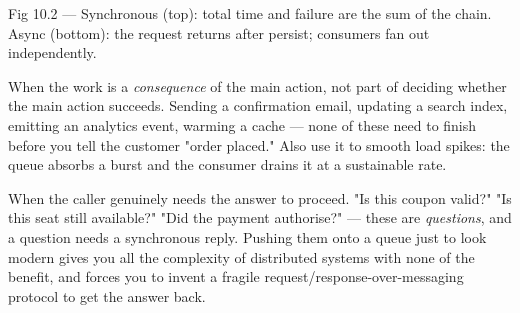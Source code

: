 \begin{wbfigure}{Fig 10.2 --- Synchronous (top): total time and failure are the sum of the chain. Async (bottom): the request returns after persist; consumers fan out independently.}
\end{wbfigure}

 When the work is a \emph{consequence} of the main action, not part of deciding whether the main action succeeds. Sending a confirmation email, updating a search index, emitting an analytics event, warming a cache --- none of these need to finish before you tell the customer "order placed." Also use it to smooth load spikes: the queue absorbs a burst and the consumer drains it at a sustainable rate.

 When the caller genuinely needs the answer to proceed. "Is this coupon valid?" "Is this seat still available?" "Did the payment authorise?" --- these are \emph{questions}, and a question needs a synchronous reply. Pushing them onto a queue just to look modern gives you all the complexity of distributed systems with none of the benefit, and forces you to invent a fragile request/response-over-messaging protocol to get the answer back.

